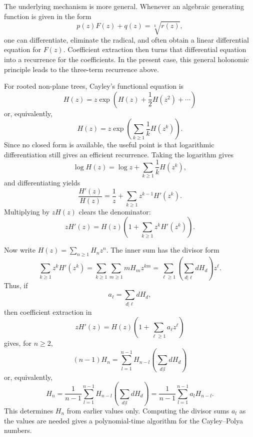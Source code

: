 The underlying mechanism is more general. Whenever an algebraic generating function is given
in the form
\begin{equation*}
    p(z)F(z) + q(z) = \sqrt[k]{r(z)},
\end{equation*}
one can differentiate, eliminate the radical, and often obtain a linear differential equation
for $F(z)$. Coefficient extraction then turns that differential equation into a recurrence for the
coefficients. In the present case, this general holonomic principle leads to the three-term
recurrence above.

For rooted non-plane trees, Cayley's functional equation is
\begin{equation*}
    H(z) = z \exp\left(H(z) + \frac{1}{2} H(z^{2}) + \cdots\right)
\end{equation*}
or, equivalently,
\begin{equation*}
    H(z) = z \exp\left(\sum_{k \geq 1} \frac{1}{k}H(z^{k})\right).
\end{equation*}
Since no closed form is available, the useful point is that logarithmic differentiation still
gives an efficient recurrence. Taking the logarithm gives
\begin{equation*}
    \log H(z) = \log z + \sum_{k \geq 1} \frac{1}{k}H(z^{k}),
\end{equation*}
and differentiating yields
\begin{equation*}
    \frac{H'(z)}{H(z)}
        = \frac{1}{z} + \sum_{k \geq 1} z^{k - 1}H'(z^{k}).
\end{equation*}
Multiplying by $zH(z)$ clears the denominator:
\begin{equation*}
    zH'(z) = H(z)\left(1 + \sum_{k \geq 1} z^{k}H'(z^{k})\right).
\end{equation*}

Now write $H(z) = \sum_{n \geq 1}H_{n}z^{n}$. The inner sum has the divisor form
\begin{equation*}
    \sum_{k \geq 1} z^{k}H'(z^{k})
        = \sum_{k \geq 1}\sum_{m \geq 1} mH_{m}z^{km}
        = \sum_{\ell \geq 1}\left(\sum_{d|\ell} dH_{d}\right)z^{\ell}.
\end{equation*}
Thus, if
\begin{equation*}
    a_{\ell} = \sum_{d|\ell} dH_{d},
\end{equation*}
then coefficient extraction in
\[
    zH'(z) = H(z)\left(1 + \sum_{\ell \geq 1} a_{\ell}z^{\ell}\right)
\]
gives, for $n \geq 2$,
\begin{equation*}
    (n - 1)H_{n} = \sum_{l = 1}^{n - 1} H_{n - l}\left(\sum_{d|l} d H_{d}\right)
\end{equation*}
or, equivalently,
\begin{equation*}
    H_{n}
    = \frac{1}{n - 1} \sum_{l = 1}^{n - 1} H_{n - l}\left(\sum_{d|l} d H_{d}\right)
    = \frac{1}{n - 1} \sum_{l = 1}^{n - 1} a_{l}H_{n - l}.
\end{equation*}
This determines $H_{n}$ from earlier values only. Computing the divisor sums $a_l$ as the
values are needed gives a polynomial-time algorithm for the Cayley--Polya numbers.

